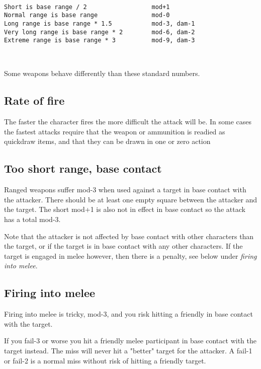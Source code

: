 \

\small \begin{verbatim}
Short is base range / 2                  mod+1
Normal range is base range               mod-0
Long range is base range * 1.5           mod-3, dam-1
Very long range is base range * 2        mod-6, dam-2
Extreme range is base range * 3          mod-9, dam-3
\end{verbatim} \normalsize

\

\noindent Some weapons behave differently than these standard numbers.


\subsection*{Rate of fire}
The faster the character fires the more difficult the attack will be. In some cases the fastest attacks require that the weapon or ammunition is readied as quickdraw items, and that they can be drawn in one or zero action


\subsection*{Too short range, base contact}
Ranged weapons suffer mod-3 when used against a target in base contact with the attacker. There should be at least one empty square between the attacker and the target. The short mod+1 is also not in effect in base contact so the attack has a total mod-3.

Note that the attacker is not affected by base contact with other characters than the target, or if the target is in base contact with any other characters. If the target is engaged in melee however, then there is a penalty, see below under \emph{firing into melee}.


\subsection*{Firing into melee}
Firing into melee is tricky, mod-3, and you risk hitting a friendly in base contact with the target.

If you fail-3 or worse you hit a friendly melee participant in base contact with the target instead. The miss will never hit a "better" target for the attacker. A fail-1 or fail-2 is a normal miss without risk of hitting a friendly target.

